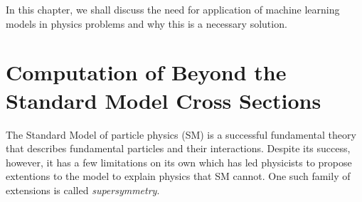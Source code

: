 In this chapter, we shall discuss the need for application of machine learning models in physics problems
and why this is a necessary solution.

 
\section{Computation of Beyond the Standard Model Cross Sections}
The Standard Model of particle physics (SM) is a successful fundamental theory that describes fundamental particles and their interactions.
Despite its success, however, it has a few limitations on its own which has led physicists to propose extentions to the model to explain physics that SM cannot. One such family of extensions is called \textit{supersymmetry}. 


